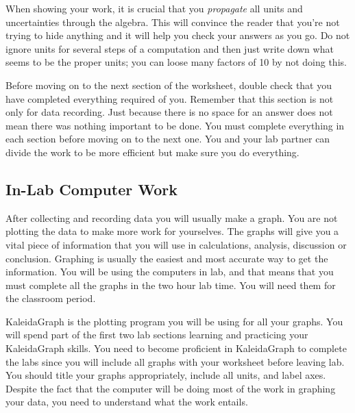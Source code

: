 When showing your work, it is crucial that you {\it propagate} all units 
and uncertainties through the algebra. This will convince the reader
that you're not trying to hide anything and it will help you check
your answers as you go.  Do not ignore units for several steps of a
computation and then just write down what seems to be the proper
units; you can loose many factors of 10 by not doing this. 

Before moving on to the next section of the worksheet, 
double check that you have completed everything required of you.  
Remember that this section is not only for data recording.  Just because 
there is no space for an answer does not mean there was nothing important
to be done.  You must complete everything in each section before moving on
to the next one.  You and your lab partner can divide the work to be more
efficient but make sure you do everything. 

\subsection{In-Lab Computer Work} 
After collecting and recording data you will usually make a graph.
You are not plotting the data to make more work for yourselves.  The
graphs will give you a vital piece of information that you will use in 
calculations,
analysis, discussion or conclusion.  Graphing is usually the easiest
and most accurate way to get the information.  You will be using the computers
in lab, and that means that you must complete all the graphs in the two hour
lab time.  You will need them for the classroom period.   

KaleidaGraph is the plotting program you will be using for all 
your graphs.  You will spend part of the first two lab sections
learning and practicing your KaleidaGraph skills.  You need to become 
proficient in KaleidaGraph to complete the labs   
since you will include all graphs with your worksheet before leaving lab.
You should title your graphs appropriately, include
all units, and label axes.  Despite the fact that the computer will be
doing most of the work in graphing your data, you need to understand
what the work entails.  

